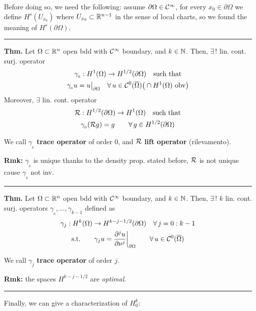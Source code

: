 Before doing so, we need the following: assume $\partial\Omega\in\mathcal{C}^\infty$, for every $x_0\in\partial\Omega$ we define $H^s(U_{x_0})$ where $U_{x_0}\subset\mathbb{R}^{n-1}$ in the sense of local charts, so we found the meaning of $H^s(\partial\Omega)$.

\rule{0.31\textwidth}{0.2pt}
\smallskip

\textbf{Thm.} Let $\Omega\subset\mathbb{R}^n$ open bdd with $\mathcal{C}^\infty$ boundary, and $k\in\mathbb{N}$. Then, $\exists\,!$ lin. cont. surj. operator 
\begin{gather*}
\gamma_{_0}:H^1(\Omega)\to H^{1/2}(\partial\Omega)\quad\text{such that} \\
\gamma_{_0} u=u\big|_{\partial\Omega}\quad\forall\, u\in\mathcal{C}^0(\overline{\Omega})\big(\cap H^1(\Omega)\text{ obv}\big)
\end{gather*}
Moreover, $\exists$ lin. cont. operator 
\begin{gather*}
\mathcal{R}:H^{1/2}(\partial\Omega)\to H^1(\Omega)\quad\text{such that} \\
\gamma_{_0}(\mathcal{R} g)=g\qquad\forall\, g\in H^{1/2}(\partial\Omega)
\end{gather*}

We call $\gamma_{_0}$ \textbf{trace operator} of order 0, and $\mathcal{R}$ \textbf{lift operator} (rilevamento).

\smallskip

\textbf{Rmk:} $\gamma_{_0}$ is unique thanks to the density prop. stated before, $\mathcal{R}$ is not unique cause $\gamma_{_0}$ not inv.

\rule{0.31\textwidth}{0.2pt}
\smallskip

\textbf{Thm.} Let $\Omega\subset\mathbb{R}^n$ open bdd with $\mathcal{C}^\infty$ boundary, and $k\in\mathbb{N}$. Then, $\exists\,!$ $k$ lin. cont. surj. operators $\gamma_{_0},\dots,\gamma_{k-1}$ defined as
\begin{gather*}
\gamma_j:H^k(\Omega)\to H^{k-j-1/2}(\partial\Omega)\quad\forall\,j=0:k-1\\
\text{s.t.}\qquad
\gamma_j u=\frac{\partial^j u}{\partial\nu^j} \bigg|_{\partial\Omega}\qquad\forall\, u\in \mathcal{C}^0(\overline{\Omega})
\end{gather*}

We call $\gamma_j$ \textbf{trace operator} of order $j$.

\smallskip

\textbf{Rmk:} the spaces $H^{k-j-1/2}$ are \emph{optimal}.

\rule{0.31\textwidth}{0.2pt}
\smallskip

Finally, we can give a characterization of $H^k_0$:

